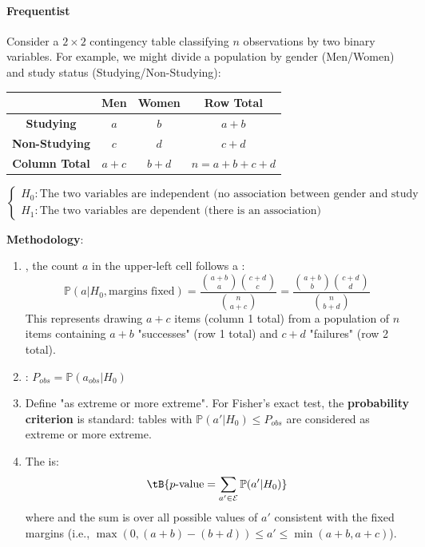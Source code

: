 \paragraph{Frequentist}
Consider a $2\times 2$ contingency table classifying $n$ observations by two binary variables.
For example, we might divide a population by gender (Men/Women) and study status (Studying/Non-Studying):
\begin{center}
    \begin{tabular}{|*{4}{c|}}
    \hline
    & \textbf{Men} & \textbf{Women} & \textbf{Row Total}\\
    \hline
    \textbf{Studying} & $a$ & $b$ & $a+b$ \\
    \hline
    \textbf{Non-Studying} & $c$ & $d$ & $c+d$ \\
    \hline
    \textbf{Column Total} & $a+c$ & $b+d$ & $n = a + b + c + d$ \\
    \hline
    \end{tabular}
\end{center}

$\begin{cases}
    H_{0}: \text{The two variables are independent (no association between gender and study status)}\\
    H_{1}: \text{The two variables are dependent (there is an association)}
\end{cases}$

\textbf{Methodology}:
\begin{enumerate}
    \item {}, the count $a$
        in the upper-left cell follows a :
        $$\mathbb{P}(a | H_0, \text{margins fixed}) = \dfrac{\binom{a+b}{a}\binom{c+d}{c}}{\binom{n}{a+c}}
        = \dfrac{\binom{a+b}{b}\binom{c+d}{d}}{\binom{n}{b+d}}$$
        This represents drawing $a+c$ items (column 1 total) from a population of $n$ items containing
        $a+b$ "successes" (row 1 total) and $c+d$ "failures" (row 2 total).

    \item {}: $P_{obs} = \mathbb{P}(a_{obs} | H_0)$

    \item Define "as extreme or more extreme". For Fisher's exact test, the \textbf{probability criterion}
        is standard: tables with $\mathbb{P}(a' | H_0) \leq P_{obs}$ are considered as extreme or more extreme.

    \item The  is:
        $$\tB{p\text{-value} = \sum_{a' \in \mathcal{E}} \mathbb{P}(a' | H_0)}$$
        where  and the sum is over all
        possible values of $a'$ consistent with the fixed margins (i.e., $\max(0, (a+b)-(b+d)) \leq a' \leq \min(a+b, a+c)$).
\end{enumerate}


